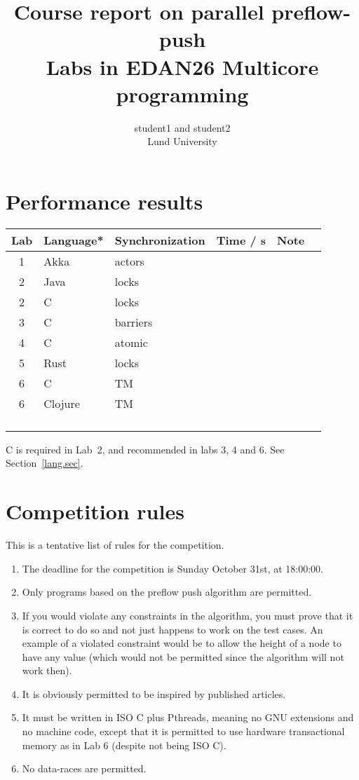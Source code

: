 \documentclass{forsete}
\author{student1 and student2\\Lund University}
\title{Course report on parallel preflow-push\\{\normalsize Labs in EDAN26 Multicore programming}}
\begin{document}
\maketitle

\tableofcontents

\section{Performance results}
\begin{center}
\begin{tabular}{|c|l|l|r|l|}
\hline
Lab & Language* & Synchronization & Time / s & Note \hspace{21mm} \ \\
\hline
1 & Akka & actors & & \\
\hline
2 & Java & locks & & \\
\hline
2 & C & locks & & \\
\hline
3 & C & barriers & & \\
\hline
4 & C & atomic & & \\
\hline
5 & Rust & locks & & \\
\hline
6 & C & TM & & \\
\hline
6 & Clojure & TM & & \\
\hline
  & & & & \\
\hline
  & & & & \\
\hline
  & & & & \\
\hline
  & & & & \\
\hline
\end{tabular}
\end{center}
\noindent * C is required in Lab~2, and recommended in labs 3, 4 and 6. See Section~\ref{lang.sec}. 

\section{Competition rules}
This is a tentative list of rules for the competition.
\begin{enumerate}
\item The deadline for the competition is Sunday October 31st, at 18:00:00.

\item Only programs based on the preflow push algorithm are permitted.

\item If you would violate any constraints in the algorithm, you must prove that it is correct to do so and
not just happens to work on the test cases. An example of a violated constraint would be to allow the height 
of a node to have any value (which would not be permitted since the algorithm will not work then).

\item It is obviously permitted to be inspired by published articles.

\item It must be written in ISO C plus Pthreads, meaning no GNU extensions and no machine code, except that it is permitted to use
hardware transactional memory as in Lab 6 (despite not being ISO C).
\item No data-races are permitted.

\end{enumerate}
\end{document}
